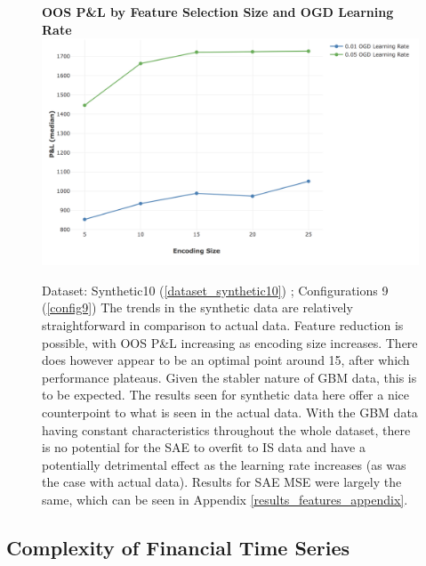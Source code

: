 \documentclass[a4paper,11pt,oneside]{article}
\theoremstyle{plain}
\theoremstyle{definition}
\begin{document}
	\begin{figure}[H]
		\centering 
		\textbf{OOS P\&L by Feature Selection Size and OGD Learning Rate}
		\includegraphics[scale=0.3]{images/results/feature_selection/synthetic_median.png} 
		\caption[OOS P\&L by Feature Selection Size and OGD Learning Rate (Synthetic Data)]{Dataset: Synthetic10 (\ref{dataset_synthetic10}) ; Configurations 9 (\ref{config9})
			\newline The trends in the synthetic data are relatively straightforward in comparison to actual data. Feature reduction is possible, with OOS P\&L increasing as encoding size increases. There does however appear to be an optimal point around 15, after which performance plateaus. Given the stabler nature of GBM data, this is to be expected. The results seen for synthetic data here offer a nice counterpoint to what is seen in the actual data. With the GBM data having constant characteristics throughout the whole dataset, there is no potential for the SAE to overfit to IS data and have a potentially detrimental effect as the learning rate increases (as was the case with actual data).
			\newline Results for SAE MSE were largely the same, which can be seen in Appendix \ref{results_features_appendix}.
		}
		\label{figure-synthetic_median}
	\end{figure}
	
	\newpage
	
	
	
	
	
	
	
	
	
	
	
	\newpage
	
	\subsection{Complexity of Financial Time Series}\label{results_finance_data}
	
\end{document}

